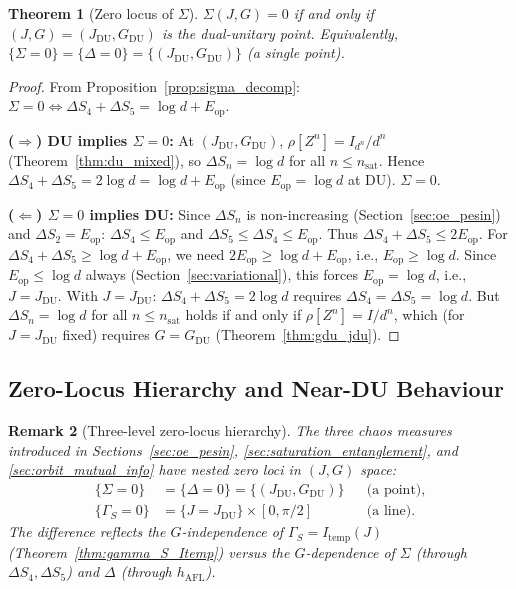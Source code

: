 \documentclass[12pt,a4paper]{article}
\newtheorem{theorem}{Theorem}[section]
\newtheorem{remark}[theorem]{Remark}
\begin{document}
\begin{theorem}[Zero locus of $\Sigma$]
\label{thm:sigma_zero}
$\Sigma(J,G)=0$ if and only if $(J,G)=(J_{\mathrm{DU}},G_{\mathrm{DU}})$ is the dual-unitary point.
Equivalently, $\{\Sigma=0\}=\{\Delta=0\}=\{(J_{\mathrm{DU}},G_{\mathrm{DU}})\}$ (a single point).
\end{theorem}

\begin{proof}
From Proposition~\ref{prop:sigma_decomp}: $\Sigma=0\Leftrightarrow\Delta S_4+\Delta S_5=\log d+E_{\mathrm{op}}$.

\textbf{($\Rightarrow$) DU implies $\Sigma=0$:} At $(J_{\mathrm{DU}},G_{\mathrm{DU}})$,
$\rho[Z^n]=I_{d^n}/d^n$ (Theorem~\ref{thm:du_mixed}), so $\Delta S_n=\log d$ for all $n\leq n_{\mathrm{sat}}$.
Hence $\Delta S_4+\Delta S_5=2\log d=\log d+E_{\mathrm{op}}$ (since $E_{\mathrm{op}}=\log d$ at DU). $\Sigma=0$.\checkmark

\textbf{($\Leftarrow$) $\Sigma=0$ implies DU:}
Since $\Delta S_n$ is non-increasing (Section~\ref{sec:oe_pesin}) and $\Delta S_2=E_{\mathrm{op}}$:
$\Delta S_4\leq E_{\mathrm{op}}$ and $\Delta S_5\leq\Delta S_4\leq E_{\mathrm{op}}$.
Thus $\Delta S_4+\Delta S_5\leq 2E_{\mathrm{op}}$.
For $\Delta S_4+\Delta S_5\geq\log d+E_{\mathrm{op}}$, we need $2E_{\mathrm{op}}\geq\log d+E_{\mathrm{op}}$,
i.e., $E_{\mathrm{op}}\geq\log d$. Since $E_{\mathrm{op}}\leq\log d$ always (Section~\ref{sec:variational}),
this forces $E_{\mathrm{op}}=\log d$, i.e., $J=J_{\mathrm{DU}}$.
With $J=J_{\mathrm{DU}}$: $\Delta S_4+\Delta S_5=2\log d$ requires $\Delta S_4=\Delta S_5=\log d$.
But $\Delta S_n=\log d$ for all $n\leq n_{\mathrm{sat}}$ holds if and only if
$\rho[Z^n]=I/d^n$, which (for $J=J_{\mathrm{DU}}$ fixed) requires $G=G_{\mathrm{DU}}$
(Theorem~\ref{thm:gdu_jdu}).
\end{proof}

\subsection{Zero-Locus Hierarchy and Near-DU Behaviour}
\label{subsec:locus_hierarchy}

\begin{remark}[Three-level zero-locus hierarchy]
The three chaos measures introduced in Sections~\ref{sec:oe_pesin},
\ref{sec:saturation_entanglement}, and \ref{sec:orbit_mutual_info}
have nested zero loci in $(J,G)$ space:
\begin{align*}
  \{\Sigma=0\} &= \{\Delta=0\} = \{(J_{\mathrm{DU}},G_{\mathrm{DU}})\} &&\text{(a point)},\\
  \{\Gamma_S=0\} &= \{J=J_{\mathrm{DU}}\}\times[0,\pi/2] &&\text{(a line)}.
\end{align*}
The difference reflects the $G$-independence of $\Gamma_S=I_{\mathrm{temp}}(J)$
(Theorem~\ref{thm:gamma_S_Itemp}) versus the $G$-dependence of $\Sigma$ (through $\Delta S_4,\Delta S_5$)
and $\Delta$ (through $h_{\mathrm{AFL}}$).
\end{remark}
\end{document}
